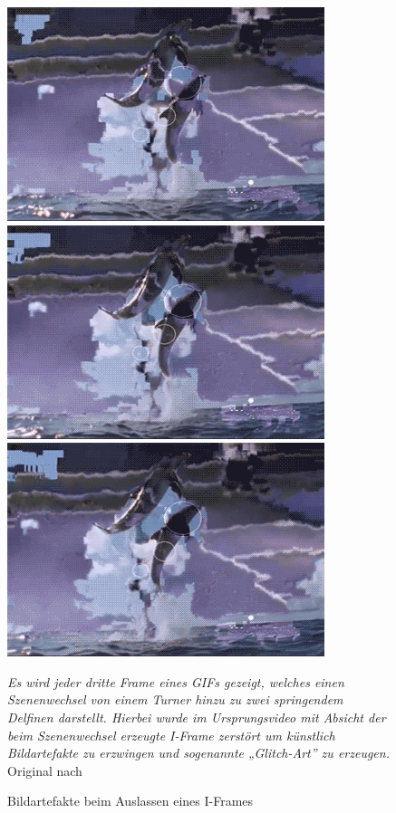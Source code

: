 \begin{figure}[h!]
        \includegraphics[scale=0.5]{images/corruptedGif/frame16.png}
            \includegraphics[scale=0.5]{images/corruptedGif/frame19.png}
                \includegraphics[scale=0.5]{images/corruptedGif/frame22.png}
    \caption{Bildartefakte beim Auslassen eines I-Frames}
    \textit{Es wird jeder dritte Frame eines GIFs gezeigt, welches einen Szenenwechsel von einem Turner hinzu zu zwei springendem Delfinen darstellt. Hierbei wurde im Ursprungsvideo mit Absicht der beim Szenenwechsel erzeugte I-Frame zerstört um künstlich Bildartefakte zu erzwingen und sogenannte „Glitch-Art” zu erzeugen.}
    \linebreak
    Original nach \cite{supergif}
\end{figure}

